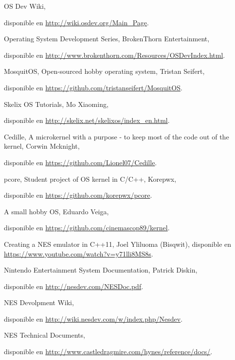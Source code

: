 \begin{thebibliography}{9}

\bibitem{}
  OS Dev Wiki,
  
  disponible en \url{http://wiki.osdev.org/Main_Page}.
 
\bibitem{}
  Operating System Development Series,
  BrokenThorn Entertainment,
  
  disponible en \url{http://www.brokenthorn.com/Resources/OSDevIndex.html}.

\bibitem{}
  MosquitOS,
  Open-sourced hobby operating system,
  Tristan Seifert,
  
  disponible en \url{https://github.com/tristanseifert/MosquitOS}.
  
\bibitem{}
  Skelix OS Tutorials,
  Mo Xiaoming,
  
  disponible en \url{http://skelix.net/skelixos/index_en.html}.
 
\bibitem{}
  Cedille,
  A microkernel with a purpose - to keep most of the code out of the kernel,
  Corwin Mcknight,
  
  disponible en \url{https://github.com/Lionel07/Cedille}.
  
\bibitem{}
  pcore,
  Student project of OS kernel in C/C++,
  Korepwx,
  
  disponible en \url{https://github.com/korepwx/pcore}.

\bibitem{}
  A small hobby OS,
  Eduardo Veiga,
  
  disponible en \url{https://github.com/cinemascop89/kernel}.


\bibitem{}
  Creating a NES emulator in C++11,
  Joel Yliluoma (Bisqwit),
  disponible en \url{https://www.youtube.com/watch?v=y71lli8MS8s}.

\bibitem{}
  Nintendo Entertainment System Documentation,
  Patrick Diskin,
  
  disponible en \url{http://nesdev.com/NESDoc.pdf}.
  
\bibitem{}
  NES Devolpment Wiki,
  
  disponible en \url{http://wiki.nesdev.com/w/index.php/Nesdev}.
  
\bibitem{}
  NES Technical Documents,
  
  disponible en \url{http://www.castledragmire.com/hynes/reference/docs/}.



\end{thebibliography}
